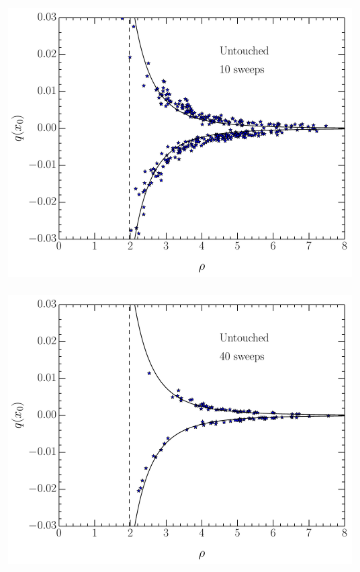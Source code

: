 %
\begin{figure}
\begin{subfigure}[]{0.5\textwidth}
\label{UTcool10}
\includegraphics[width=\columnwidth]{./UTcool10.pdf}
\end{subfigure}
\begin{subfigure}[]{0.5\textwidth}
\label{UTcool40}
\includegraphics[width=\columnwidth]{./UTcool40.pdf}
\end{subfigure}
\begin{subfigure}[]{0.5\textwidth}
\label{VOcool10}

\end{subfigure}
\end{figure}
